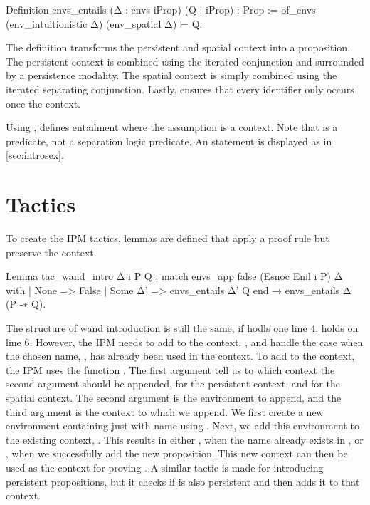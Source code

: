\documentclass[thesis.tex]{subfiles}
\begin{document}
{\begin{coqcode}
  Definition envs_entails 
      (Δ : envs iProp) (Q : iProp) : Prop :=
    of_envs (env_intuitionistic Δ) (env_spatial Δ) ⊢ Q.
\end{coqcode}
The definition  transforms the persistent and spatial context into a proposition. The persistent context is combined using the iterated conjunction and surrounded by a persistence modality. The spatial context is simply combined using the iterated separating conjunction. Lastly,  ensures that every identifier only occurs once the context.

Using ,  defines entailment where the assumption is a context. Note that  is a \coq predicate, not a separation logic predicate. An  statement is displayed as in \cref{sec:introsex}.

\section{Tactics}\label{sec:iristactics}
To create the IPM tactics, lemmas are defined that apply a proof rule but preserve the context.
\begin{coqcode}
  Lemma tac_wand_intro Δ i P Q :
    match envs_app false (Esnoc Enil i P) Δ with
    | None => False
    | Some Δ' => envs_entails Δ' Q
    end →
    envs_entails Δ (P -∗ Q).
\end{coqcode}
The structure of wand introduction is still the same, if  hodls one line 4,  holds on line 6. However, the IPM needs to add  to the context, , and handle the case when the chosen name, , has already been used in the context. To add  to the context, the IPM uses the function . The first argument tell us to which context the second argument should be appended,  for the persistent context, and  for the spatial context. The second argument is the environment to append, and the third argument is the context to which we append. We first create a new environment containing just  with name  using . Next, we add this environment to the existing context, . This results in either , when the name already exists in , or , when we successfully add the new proposition. This new context can then be used as the context for proving . A similar tactic is made for introducing persistent propositions, but it checks if  is also persistent and then adds it to that context.

}
\end{document}
